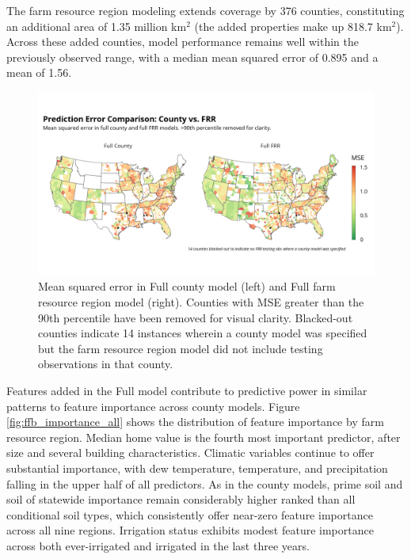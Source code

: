\documentclass[12pt]{article}
\begin{document}
The farm resource region modeling extends coverage by 376 counties, constituting an additional area of 1.35 million km$^2$ (the added properties make up 818.7 km$^2$). Across these added counties, model performance remains well within the previously observed range, with a median mean squared error of 0.895 and a mean of 1.56.

\begin{figure}
    \centering
    \includegraphics[width=1\textwidth]{exhibits/compare_ffb_fcb_mse.png}
    \caption{Mean squared error in Full county model (left) and Full farm resource region model (right). Counties with MSE greater than the 90th percentile have been removed for visual clarity. Blacked-out counties indicate 14 instances wherein a county model was specified but the farm resource region model did not include testing observations in that county.}
    \label{fig:compare_ffb_fcb_mse}
\end{figure}

Features added in the Full model contribute to predictive power in similar patterns to feature importance across county models. Figure \ref{fig:ffb_importance_all} shows the distribution of feature importance by farm resource region. Median home value is the fourth most important predictor, after size and several building characteristics. Climatic variables continue to offer substantial importance, with dew temperature, temperature, and precipitation falling in the upper half of all predictors. As in the county models, prime soil and soil of statewide importance remain considerably higher ranked than all conditional soil types, which consistently offer near-zero feature importance across all nine regions. Irrigation status exhibits modest feature importance across both ever-irrigated and irrigated in the last three years.
\end{document}
